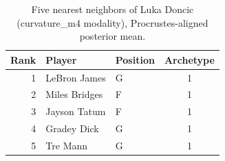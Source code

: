 \begin{table}[htbp]
  \centering\small
  \begin{tabular}{rllc}
    \toprule
    Rank & Player & Position & Archetype \\
    \midrule
    1 & LeBron James & G & 1 \\
    2 & Miles Bridges & F & 1 \\
    3 & Jayson Tatum & F & 1 \\
    4 & Gradey Dick & G & 1 \\
    5 & Tre Mann & G & 1 \\
    \bottomrule
  \end{tabular}
  \caption{Five nearest neighbors of Luka Doncic (curvature_m4 modality), Procrustes-aligned posterior mean.}
  \label{tab:Luka_Doncic_neighbors_curvature_m4}
\end{table}


